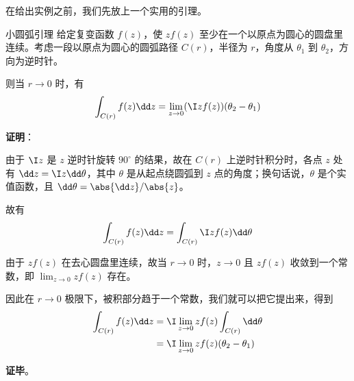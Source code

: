 在给出实例之前，我们先放上一个实用的引理。

\begin{lemma}{小圆弧引理}\label{JdLem_lem1}
给定复变函数 $f(z)$，使 $zf(z)$ 至少在一个以原点为圆心的圆盘里连续。考虑一段以原点为圆心的圆弧路径 $C(r)$，半径为 $r$，角度从 $\theta_1$ 到 $\theta_2$，方向为逆时针。

则当 $r\to 0$ 时，有
\begin{equation}
\int_{C(r)}f(z)\dd z=\lim\limits_{z\to 0}(\I zf(z))(\theta_2-\theta_1)
\end{equation}

\end{lemma}


\textbf{证明}：

由于 $\I z$ 是 $z$ 逆时针旋转 $90^\circ$ 的结果，故在 $C(r)$ 上逆时针积分时，各点 $z$ 处有 $\dd z=\I z\dd \theta$，其中 $\theta$ 是从起点绕圆弧到 $z$ 点的角度；换句话说，$\theta$ 是个实值函数，且 $\dd \theta=\abs{\dd z}/\abs{z}$。


故有
\begin{equation}
\begin{aligned}
\int_{C(r)}f(z)\dd z&=\int_{C(r)}\I zf(z)\dd \theta\\
\end{aligned}
\end{equation}

由于 $zf(z)$ 在去心圆盘里连续，故当 $r\to 0$ 时，$z\to 0$ 且 $zf(z)$ 收敛到一个常数，即 $\lim_{z\to 0}zf(z)$ 存在。

因此在 $r\to 0$ 极限下，被积部分趋于一个常数，我们就可以把它提出来，得到
\begin{equation}
\begin{aligned}
\int_{C(r)}f(z)\dd z&=\I \lim_{z\to 0}zf(z)\int_{C(r)}\dd \theta\\
&=\I \lim_{z\to 0}zf(z)(\theta_2-\theta_1)
\end{aligned}
\end{equation}

\textbf{证毕}。












